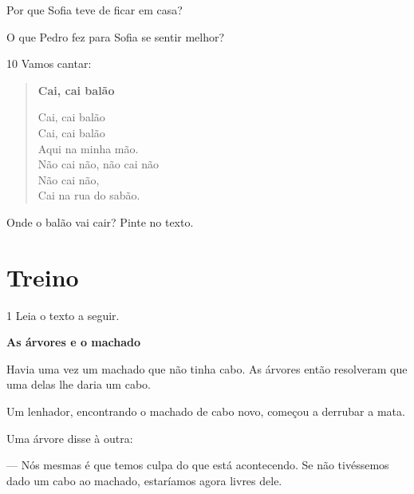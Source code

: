 \begin{escolha}

\item{Por que Sofia teve de ficar em casa?}\\

\item{O que Pedro fez para Sofia se sentir melhor?}\\

\end{escolha}

\num{10} Vamos cantar:

\begin{myquote}
\begin{verse}
\textbf{Cai, cai balão}

Cai, cai balão\\
Cai, cai balão\\
Aqui na minha mão.\\
Não cai não, não cai não\\
Não cai não,\\
Cai na rua do sabão.
\end{verse}

\end{myquote}

Onde o balão vai cair? Pinte no texto.


\section*{Treino}

\num{1} Leia o texto a seguir.

\begin{myquote}
\textbf{As árvores e o machado}

Havia uma vez um machado que não tinha cabo.
As árvores então resolveram que uma delas lhe daria
um cabo.

Um lenhador, encontrando o machado de cabo novo,
começou a derrubar a mata.

Uma árvore disse à outra:

--- Nós mesmas é que temos culpa do que está
acontecendo. Se não tivéssemos dado um cabo ao machado,
estaríamos agora livres dele.

\end{myquote}

